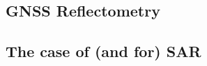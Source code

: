 \subsection{GNSS Reflectometry}
\label{subsec:GNSS_Reflectometry}

\lipsum

\subsection{The case of (and for) SAR}
\label{subsec:SAR}

\lipsum


